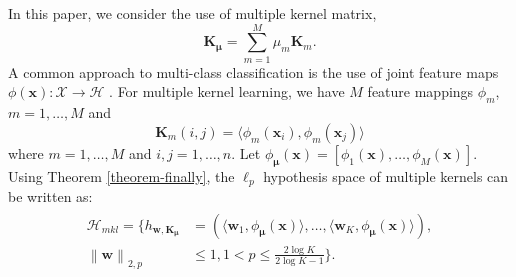 \documentclass{article}
\begin{document}
In this paper, we consider the use of multiple kernel matrix,
$$\mathbf{K}_{\bm \mu}=\sum_{m=1}^M \mu_m\mathbf{K}_m.$$
A common approach to multi-class classification is the use of joint feature
maps $\phi(\mathbf x):\mathcal X \to \mathcal H$ \cite{TsochantaridisHJA04}.
For multiple kernel learning, we have $M$ feature mappings $\phi_m$, $m=1,\ldots,M$ and
$$\mathbf{K}_m(i,j)=\langle \phi_m(\mathbf x_i), \phi_m(\mathbf x_j)\rangle$$where $
m=1,\ldots,M$ and $i,j=1, \ldots, n$.
Let $\phi_{\bm \mu}(\mathbf x)=[\phi_1(\mathbf x),\ldots,\phi_M(\mathbf x)]$.
Using Theorem \ref{theorem-finally}, the $\ell_p$ hypothesis space of multiple kernels can be written as:
 \begin{align*}
 \label{hypothspapcemkl}
   \begin{aligned}
   \mathcal{H}_{mkl}=\Big\{h_{\mathbf{w},\mathbf{K}_{\bm \mu}}&=\left(\langle \mathbf w_1,\phi_{\bm \mu}(\mathbf x)\rangle,\ldots, \langle\mathbf w_K,\phi_{\bm \mu}(\mathbf x)\rangle\right),\\
   \left\|\mathbf  w \right\|_{2,p}&\leq 1, 1 < p \leq \frac{2\log K}{2\log K-1}
  \Big\}.
   \end{aligned}
 \end{align*}
\end{document}
